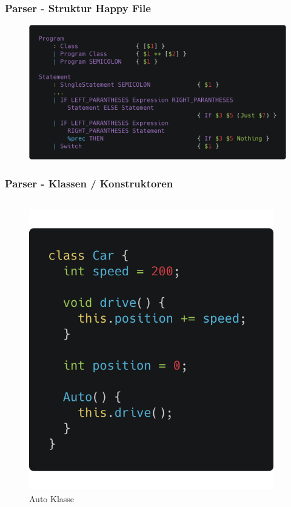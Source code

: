 \begin{frame}[fragile]
	\frametitle{Parser - Struktur Happy File}
	\begin{figure}[H]
		\centering
		\includegraphics[width=0.7\linewidth]{images/parser/ast-example.png}
	\end{figure}
\end{frame}
\begin{frame}
	\frametitle{Parser - Klassen / Konstruktoren}
	\begin{columns}[T]
	\begin{column}{.48\textwidth}

	\begin{figure}[H]
		\centering
		\includegraphics[width=0.6\linewidth]{images/parser/car-class.png}
		\caption{Auto Klasse}
		\label{fig:images/parser/car-class}
	\end{figure}
	\end{column}%
	\hfill%
	\begin{column}{.48\textwidth}


\end{column}
\end{columns}
\end{frame}
